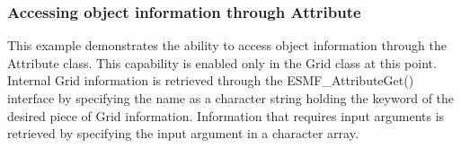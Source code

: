  
\setlength{\oldparskip}{\parskip}
\setlength{\parskip}{1.5ex}
\setlength{\oldparindent}{\parindent}
\setlength{\parindent}{0pt}
\setlength{\oldbaselineskip}{\baselineskip}
\setlength{\baselineskip}{11pt}
 
\def\bv{\begin{verbatim}}
\def\ev{\end{verbatim}}
\def\be{\begin{equation}}
\def\ee{\end{equation}}
\def\bea{\begin{eqnarray}}
\def\eea{\end{eqnarray}}
\def\bi{\begin{itemize}}
\def\ei{\end{itemize}}
\def\bn{\begin{enumerate}}
\def\en{\end{enumerate}}
\def\bd{\begin{description}}
\def\ed{\end{description}}
\def\({\left (}
\def\){\right )}
\def\[{\left [}
\def\]{\right ]}
\def\<{\left  \langle}
\def\>{\right \rangle}
\def\cI{{\cal I}}
\def\diag{\mathop{\rm diag}}
\def\tr{\mathop{\rm tr}}


 

   \subsubsection{Accessing object information through Attribute} 
   \label{ex:AttributeInternalInfoEx}
  
   This example demonstrates the ability to access object information through
   the Attribute class.  This capability is enabled only in the Grid class
   at this point.  Internal Grid information is retrieved through the 
   ESMF\_AttributeGet() interface by specifying the name as a character
   string holding the keyword of the desired piece of Grid information.
   Information that requires input arguments is retrieved by
   specifying the input argument in a character array.
  
